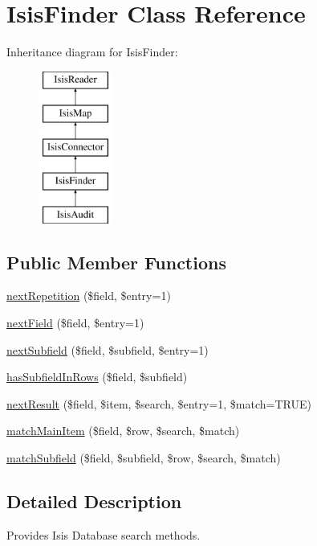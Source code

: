 \hypertarget{classIsisFinder}{
\section{IsisFinder Class Reference}
\label{classIsisFinder}
}
Inheritance diagram for IsisFinder:\begin{figure}[H]
\begin{center}
\leavevmode
\includegraphics[height=5cm]{classIsisFinder}
\end{center}
\end{figure}
\subsection*{Public Member Functions}
\begin{DoxyCompactItemize}
\item 
\hyperlink{classIsisFinder_ac4e3a8f45995cbf940b3f2899b71bd1e}{nextRepetition} (\$field, \$entry=1)
\item 
\hyperlink{classIsisFinder_a7d708e281bea35ee38f5875c8f2cad8d}{nextField} (\$field, \$entry=1)
\item 
\hyperlink{classIsisFinder_aa367980783d341197e003684a639ff1a}{nextSubfield} (\$field, \$subfield, \$entry=1)
\item 
\hyperlink{classIsisFinder_a41410b18c4462c05ac669e4ee889d8a7}{hasSubfieldInRows} (\$field, \$subfield)
\item 
\hyperlink{classIsisFinder_af965ba4acae18aa61bc4a3242bcdadfc}{nextResult} (\$field, \$item, \$search, \$entry=1, \$match=TRUE)
\item 
\hyperlink{classIsisFinder_ab35a9bb21e83df846b6ff57bcbe117ae}{matchMainItem} (\$field, \$row, \$search, \$match)
\item 
\hyperlink{classIsisFinder_a20539e44cfc30ca3897e174781c4b26c}{matchSubfield} (\$field, \$subfield, \$row, \$search, \$match)
\end{DoxyCompactItemize}


\subsection{Detailed Description}
Provides Isis Database search methods. 

